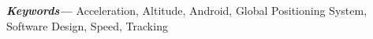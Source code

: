 \documentclass[11pt,peerreview]{IEEEtran}
\providecommand{\keywords}[1]
{
  \small	
  \textbf{\textit{Keywords---}} #1
}
\begin{document}
\keywords{Acceleration, Altitude, Android, Global Positioning System, Software Design, Speed, Tracking}

\pagebreak

\tableofcontents
\pagebreak
\listoffigures
\listoftables
\pagebreak
\printacronyms
\pagebreak

\setcounter{page}{1}








\pagebreak



\pagebreak


\end{document}
